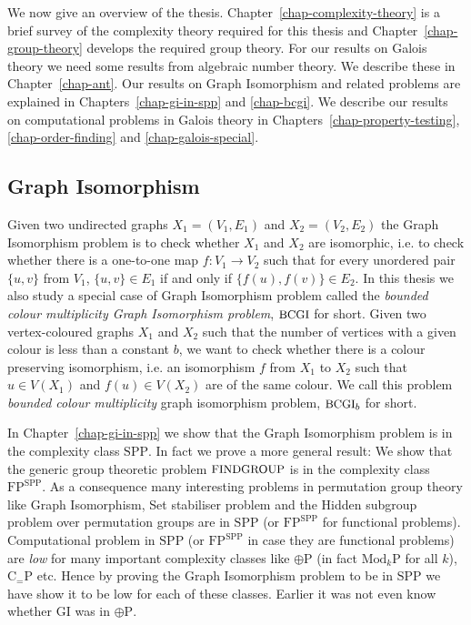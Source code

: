 \documentclass[11pt]{madras}%
\theoremstyle{remark}
\newcommand{\ModkP}[1]{{\ensuremath{\mathrm{Mod}_{#1}\mathrm{P}}}}
\newcommand{\ProblemFont}[1]{{\ensuremath{\textrm{\small #1}}}}
\begin{document}
We now give an overview of the thesis.
Chapter~\ref{chap-complexity-theory} is a brief survey of the
complexity theory required for this thesis and
Chapter~\ref{chap-group-theory} develops the required group theory.
For our results on Galois theory we need some results from algebraic
number theory. We describe these in Chapter~\ref{chap-ant}.  Our
results on Graph Isomorphism and related problems are explained in
Chapters~\ref{chap-gi-in-spp} and \ref{chap-bcgi}. We describe our
results on computational problems in Galois theory in
Chapters~\ref{chap-property-testing}, \ref{chap-order-finding} and
\ref{chap-galois-special}.


\subsection*{Graph Isomorphism}

Given two undirected graphs $X_1 = (V_1,E_1)$ and $X_2= (V_2,E_2)$ the
Graph Isomorphism problem is to check whether $X_1$ and $X_2$ are
isomorphic, i.e. to check whether there is a one-to-one map $f: V_1
\to V_2$ such that for every unordered pair $\{u,v\}$ from $V_1$,
$\{u,v\} \in E_1$ if and only if $\{f(u), f(v)\} \in E_2$. In this
thesis we also study a special case of Graph Isomorphism problem
called the \emph{bounded colour multiplicity Graph Isomorphism
  problem}, $\ProblemFont{BCGI}$ for short. Given two vertex-coloured
graphs $X_1$ and $X_2$ such that the number of vertices with a given
colour is less than a constant $b$, we want to check whether there is
a colour preserving isomorphism, i.e. an isomorphism $f$ from $X_1$ to
$X_2$ such that $u \in V(X_1)$ and $f(u) \in V(X_2)$ are of the same
colour.  We call this problem \emph{bounded colour multiplicity} graph
isomorphism problem, $\ProblemFont{BCGI}_b$ for short.

In Chapter~\ref{chap-gi-in-spp} we show that the Graph Isomorphism
problem is in the complexity class $\mathrm{SPP}$. In fact we prove a
more general result: We show that the generic group theoretic problem
$\ProblemFont{FINDGROUP}$ is in the complexity class
$\mathrm{FP}^{\mathrm{SPP}}$. As a consequence many interesting
problems in permutation group theory like Graph Isomorphism, Set
stabiliser problem and the Hidden subgroup problem over permutation
groups are in $\mathrm{SPP}$ (or $\mathrm{FP}^{\mathrm{SPP}}$ for
functional problems).  Computational problem in $\mathrm{SPP}$ (or
$\mathrm{FP}^{\mathrm{SPP}}$ in case they are functional problems) are
\emph{low} for many important complexity classes like $\oplus
\mathrm{P}$ (in fact $\ModkP{k}$ for all $k$),
$\mathrm{C}_{=}\mathrm{P}$ etc. Hence by proving the Graph Isomorphism
problem to be in $\mathrm{SPP}$ we have show it to be low for each of
these classes. Earlier it was not even know whether {\small GI} was in
$\oplus \mathrm{P}$.
\end{document}
